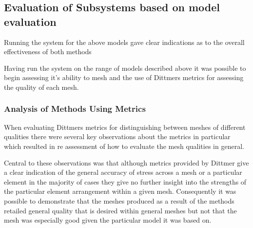 \newpage
\subsection{Evaluation of Subsystems based on model evaluation}
Running the system for the above models gave clear indications as to the overall effectiveness of both methods

Having run the system on the range of models described above it was possible to begin assessing it's ability to mesh and the use of Dittmers metrics for assessing 
the quality of each mesh.

\subsubsection{Analysis of Methods Using Metrics}
When evaluating Dittmers metrics for distinguishing between meshes of different qualities there were several key observations about the metrics in particular which resulted in re assessment of how to evaluate the mesh qualities in general.


Central to these observations was that although metrics provided by Dittmer give a clear indication of the general accuracy of stress across a mesh or a particular element in the majority of cases they give no further insight into the strengths of the particular element arrangement within a given mesh. Consequently it was possible to demonstrate that the meshes produced as a result of the methods retailed general quality that is desired within general meshes but not that the mesh was especially good given the particular model it was based on. \\

